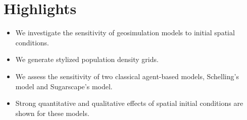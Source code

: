 \documentclass[11pt,a4paper]{article}        %
\begin{document}
\section*{Highlights}


\begin{itemize}
	\item We investigate the sensitivity of geosimulation models to initial spatial conditions.
	\item We generate stylized population density grids.
	\item We assess the sensitivity of two classical agent-based models, Schelling's model and Sugarscape's model.
	\item Strong quantitative and qualitative effects of spatial initial conditions are shown for these models.
\end{itemize}
\end{document}
